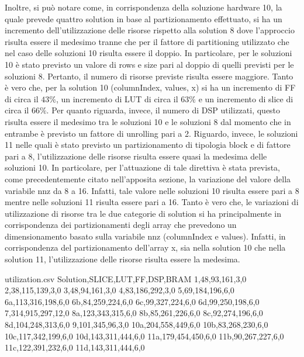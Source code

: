 Inoltre, si può notare come, in corrispondenza della soluzione hardware 10, la quale prevede quattro solution in base al partizionamento effettuato, si ha un incremento dell'utilizzazione delle risorse rispetto alla solution 8 dove l'approccio risulta essere il medesimo tranne che per il fattore di partitioning utilizzato che nel caso delle soluzioni 10 risulta essere il doppio. In particolare, per le soluzioni 10 è stato previsto un valore di rows e size pari al doppio di quelli previsti per le soluzioni 8. Pertanto, il numero di risorse previste risulta essere maggiore. Tanto è vero che, per la solution 10 (columnIndex, values, x) si ha un incremento di FF di circa il $43\%$, un incremento di LUT di circa il $63\%$ e un incremento di slice di circa il $66\%$. Per quanto riguarda, invece, il numero di DSP utilizzati, questo risulta essere il medesimo tra le soluzioni 10 e le soluzioni 8 dal momento che in entrambe è previsto un fattore di unrolling pari a 2. Riguardo, invece, le soluzioni 11 nelle quali è stato previsto un partizionamento di tipologia block e di fattore pari a 8, l'utilizzazione delle risorse risulta essere quasi la medesima delle soluzioni 10. In particolare, per l'attuazione di tale direttiva è stata prevista, come precedentemente citato nell'apposita sezione, la variazione del valore della variabile nnz da 8 a 16. Infatti, tale valore nelle soluzioni 10 risulta essere pari a 8 mentre nelle soluzioni 11 risulta essere pari a 16. Tanto è vero che, le variazioni di utilizzazione di risorse tra le due categorie di solution si ha principalmente in corrispondenza dei partizionamenti degli array che prevedono un dimensionamento basato sulla variabile nnz (columnIndex e values). Infatti, in corrispondenza del partizionamento dell'array x, sia nella solution 10 che nella solution 11, l'utilizzazione delle risorse risulta essere la medesima.



\begin{filecontents}{utilization.csv}
	Solution,SLICE,LUT,FF,DSP,BRAM
	1,48,93,161,3,0
	2,38,115,139,3,0
	3,48,94,161,3,0
	4,83,186,292,3,0
	5,69,184,196,6,0
	6a,113,316,198,6,0
	6b,84,259,224,6,0
	6c,99,327,224,6,0
	6d,99,250,198,6,0
	7,314,915,297,12,0
	8a,123,343,315,6,0
	8b,85,261,226,6,0
	8c,92,274,196,6,0
	8d,104,248,313,6,0
	9,101,345,96,3,0
	10a,204,558,449,6,0
	10b,83,268,230,6,0
	10c,117,342,199,6,0
	10d,143,311,444,6,0
	11a,179,454,450,6,0
	11b,90,267,227,6,0
	11c,122,391,232,6,0
	11d,143,311,444,6,0
\end{filecontents}

